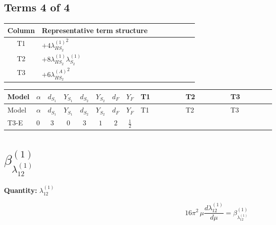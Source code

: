 \documentclass[8pt]{article}
\begin{document}
\begin{landscape}
\subsection*{Terms 4 of 4}
\begin{center}
\begin{tabular}{@{}c >{\raggedright\arraybackslash}p{0.82\linewidth}@{}}
\toprule
Column & Representative term structure \\
\midrule
T1 & \(\displaystyle +4 {\lambda_{HS_2}^{(1)}}^2\) \\
\midrule
T2 & \(\displaystyle +8 {\lambda_{HS_2}^{(1)}} {\lambda_{S_2}^{(1)}}\) \\
\midrule
T3 & \(\displaystyle +6 {\lambda_{HS_2}^{(A)}}^2\) \\
\midrule
\bottomrule
\end{tabular}
\end{center}
\smallskip
\tiny
\begin{longtable}{@{}llcccccc >{\raggedright\arraybackslash}p{0.21\linewidth} >{\raggedright\arraybackslash}p{0.21\linewidth} >{\raggedright\arraybackslash}p{0.21\linewidth}@{}}
\toprule
Model & $\alpha$ & $d_{S_1}$ & $Y_{S_1}$ & $d_{S_2}$ & $Y_{S_2}$ & $d_F$ & $Y_F$ & T1 & T2 & T3 \\
\midrule
\endfirsthead
\toprule
Model & $\alpha$ & $d_{S_1}$ & $Y_{S_1}$ & $d_{S_2}$ & $Y_{S_2}$ & $d_F$ & $Y_F$ & T1 & T2 & T3 \\
\midrule
\endhead
T3-E & $0$ & $3$ & $0$ & $3$ & $1$ & $2$ & $\frac{1}{2}$ & \scriptsize\adjustbox{max width=\linewidth}{$\begin{gathered} +4 {\lambda_{HS_2}^{(1)}}^2\end{gathered}$} & \scriptsize\adjustbox{max width=\linewidth}{$\begin{gathered} +8 {\lambda_{HS_2}^{(1)}} {\lambda_{S_2}^{(1)}}\end{gathered}$} & \scriptsize\adjustbox{max width=\linewidth}{$\begin{gathered} +6 {\lambda_{HS_2}^{(A)}}^2\end{gathered}$} \\
\midrule
\bottomrule
\end{longtable}
\clearpage
\section*{$\beta_{\lambda_{12}^{(1)}}^{(1)}$}
\noindent\textbf{Quantity: }$\lambda_{12}^{(1)}$\par\smallskip
\[16\pi^2\,\mu\frac{d \lambda_{12}^{(1)}}{d\mu}=\beta_{\lambda_{12}^{(1)}}^{(1)}\]

\end{landscape}
\end{document}
